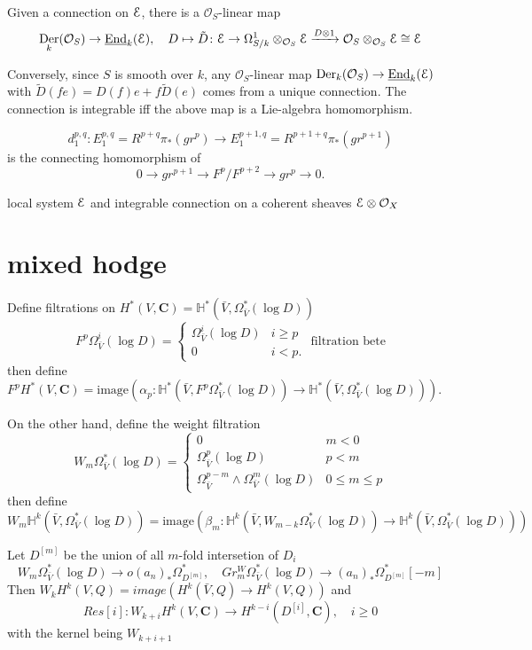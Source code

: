 \documentclass[leqno]{amsart}
\newcommand{\EE}{\EuScript{E}}
\newcommand{\C}{\mathbf C}
\newcommand{\oo}{\mathcal O}
\newcommand{\1}{\mathbf{1}}
\DeclareMathOperator{\Der}{Der}
\DeclareMathOperator{\End}{End}
\theoremstyle{definition}
\theoremstyle{remark}
\begin{document}
Given a connection on $\EE$,
there is a  $\oo_S$-linear map
 \[
	 \Der_k(\oo_S)\to \underline{\End}_k(\EE),\quad
	 D\mapsto
	 \tilde{D}\colon 
	 \EE\to \Omega_{S/k}^1\otimes_{\oo_S}\EE
	 \xrightarrow{D\otimes 1}
	 \oo_S\otimes_{\oo_S}\EE\cong \EE
\]

Conversely, since $S$ is smooth over  $k$,
any  $\oo_S$-linear map
$\Der_k(\oo_S)\to \underline{\End}_k(\EE)$
with  $ \tilde{D}(fe)=D(f)e+f\tilde{D}(e)$
comes from a unique connection.
The connection is integrable iff
the above map is a Lie-algebra homomorphism.

 \[
	 d_1^{p,q}\colon E_1^{p,q}=R^{p+q}\pi_*(gr^p)\to 
	 E_1^{p+1,q}=R^{p+1+q}\pi_*(gr^{p+1})
\]
is the connecting homomorphism of 
\[
	0\to gr^{p+1}\to F^p/F^{p+2}\to gr^p\to 0.
\]

local system $\EE$ and 
integrable connection on a coherent sheaves $\EE\otimes\oo_X$


\section{mixed hodge}

Define filtrations on 
$H^*(V,\C)=\mathbb{H}^*
(\bar{V},\Omega^*_{\bar{V}}(\log D))$
\[
	F^p\Omega^i_{\bar{V}}(\log D)=
	\begin{cases}
		\Omega^i_{\bar{V}}(\log D)&
		i\geq p\\
		0 & i<p.
	\end{cases}
	\text{ filtration bete}
\]
then define
$F^pH^*(V,\C)=\text{image}
(\alpha_p\colon\mathbb{H}^*
(\bar{V},F^p\Omega^*_{\bar{V}}(\log D))\to
\mathbb{H}^*
(\bar{V},\Omega^*_{\bar{V}}(\log D))
)$.

On the other hand, define the weight filtration
\[
	W_m\Omega^*_{\bar{V}}(\log D)=
	\begin{cases}
		0 & m<0\\
		\Omega^p_{\bar{V}}(\log D)&
		p<m\\
		\Omega^{p-m}_{\bar{V}}\wedge
		\Omega^m_{\bar{V}}(\log D)&
		0\leq m\leq p
	\end{cases}
\]
then define
$W_m\mathbb{H}^k
(\bar{V},\Omega^*_{\bar{V}}(\log D))=
\text{image}(
\beta_m\colon
\mathbb{H}^k
(\bar{V},W_{m-k}\Omega^*_{\bar{V}}(\log D))\to
\mathbb{H}^k
(\bar{V},\Omega^*_{\bar{V}}(\log D))
)$ 

Let $D^{[m]}$ be the union of all $m$-fold
intersetion of  $D_i$
 \[
	 W_m\Omega_{\bar{V}}^*(\log D)
	 \to o
	 (a_n)_*\Omega_{D^{[m]}}^*,\quad
	 Gr^W_m \Omega_{\bar{V}}^*(\log D) \to 
	 (a_n)_*\Omega_{D^{[m]}}^*[-m]
\]
Then
$W_kH^k(V,Q)=image(
H^k(\bar{V},Q)\to H^k(V,Q))$
and 
\[
	Res[i]\colon 
	W_{k+i} H^k(V,\C)\to 
	H^{k-i}(D^{[i]},\C),\quad i\geq0
\]
with the kernel being $W_{k+i+1}$
\end{document}

